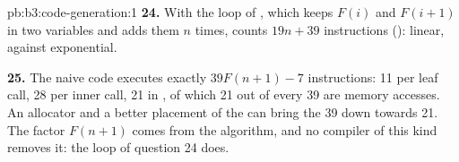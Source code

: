 \begin{solution}{pb:b3:code-generation:1}
\textbf{24.} With the loop of , which keeps $F(i)$ and $F(i+1)$ in two variables and adds them $n$ times,  counts $19n + 39$ instructions (): linear, against exponential.

\textbf{25.} The naive code executes exactly $39F(n+1) - 7$ instructions: 11 per leaf call, 28 per inner call, 21 in , of which 21 out of every 39 are memory accesses. An allocator and a better placement of the  can bring the 39 down towards 21. The factor $F(n+1)$ comes from the algorithm, and no compiler of this kind removes it: the loop of question 24 does.
\end{solution}
